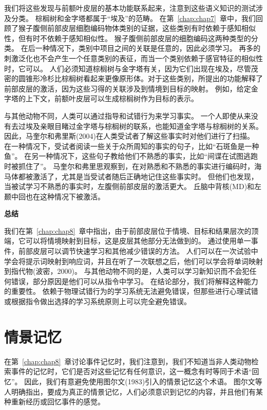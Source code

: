我们将这些发现与前额叶皮层的基本功能联系起来，注意到这些语义知识的测试涉及分类。
棕榈树和金字塔都属于“埃及”的范畴。
在第~\ref{chap:chap7}~章中，我们回顾了猴子腹侧前部皮层细胞编码物体类别的证据，这些类别有时依赖于感知相似性，但有时不依赖于感知相似性。
猴子腹侧前部皮层的细胞编码这两种类型的分类。
在后一种情况下，类别中项目之间的关联是任意的，因此必须学习。
再多的刺激泛化也不会产生一个任意类别的表征，而当一个类别依赖于感官特征的相似性时，它可以。
人们必须知道棕榈树与金字塔有关，因为它们出现在埃及，尽管茂密的圆锥形冷杉比棕榈树看起来更像原形体。对于这些类别，所提出的功能解释了前部皮层的激活，因为这些习得的关联涉及到情境到目标的映射。
例如，给定金字塔的上下文，前额叶皮层可以生成棕榈树作为目标的表示。
\par


与其他动物不同，人类可以通过指导和试错行为来学习事实。
一个人即使从来没有去过埃及亲眼目睹过金字塔与棕榈树的联系，也能知道金字塔与棕榈树的关系。
因此，马奎尔和弗里斯(2004)在人类受试者了解这些事实时对他们进行了扫描。
在一种情况下，受试者阅读一些关于众所周知的事实的句子，比如“石斑鱼是一种鱼”。
在另一种情况下，这些句子教给他们不熟悉的事实，比如“间谍在试图逃跑时被抓住了”。
马奎尔和弗里思观察到，在对熟悉和不熟悉的事实进行编码时，海马体都被激活了，尤其是当受试者随后正确地记住这些事实时。
但他们也发现，当被试学习不熟悉的事实时，左腹侧前部皮层的激活更大。
丘脑中背核(MD)和左颞中回也在这种情况下被激活。
\par



\textbf{总结}
\par
我们在第~\ref{chap:chap8}~章中指出，由于前部皮层位于情境、目标和结果层次的顶端，它可以将情境映射到目标，这是皮层其他部分无法做到的。
通过使用单一事件，前部皮层可以调节快速学习和其他减少错误的方法。
人们可以在一次试验中学会将提示词映射到响应词，并且在听了一次联想之后，他们可以学会将单词映射到指代物(波密，2000)。
与其他动物不同的是，人类可以学习新知识而不会犯任何错误，部分原因是他们可以从指令中学习。
在结论部分，我们将解释这种能力的重要性。
依赖于物理试错行为的学习系统无法避免错误，但那些进行心理试错或根据指令做出选择的学习系统原则上可以完全避免错误。



\section{情景记忆}

在第~\ref{chap:chap8}~章讨论事件记忆时，我们注意到，我们不知道当非人类动物检索事件的记忆时，它们是否对这些记忆有任何意识，这一概念有时等同于术语“回忆”。
因此，我们有意避免使用图尔文(1983)引入的情景记忆这个术语。
图尔文等人明确指出，要成为真正的情景记忆，人们必须意识到记忆的内容，并且他们有某种重新经历或回忆事件的感觉。
\par



